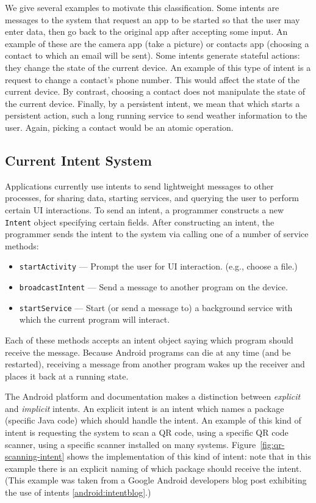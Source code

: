 \documentclass{acm_proc_article-sp}
\begin{document}
We give several examples to motivate this classification.  Some
intents are messages to the system that request an app to be started
so that the user may enter data, then go back to the original app
after accepting some input.  An example of these are the camera app
(take a picture) or contacts app (choosing a contact to which an email
will be sent).  Some intents generate stateful actions: they change
the state of the current device.  An example of this type of intent is
a request to change a contact's phone number.  This would affect the
state of the current device.  By contrast, choosing a contact does not
manipulate the state of the current device.  Finally, by a persistent
intent, we mean that which starts a persistent action, such a long
running service to send weather information to the user.  Again,
picking a contact would be an atomic operation.

\subsection{Current Intent System}

Applications currently use intents to send lightweight messages to
other processes, for sharing data, starting services, and querying the
user to perform certain UI interactions.  To send an intent, a
programmer constructs a new \texttt{Intent} object specifying certain
fields.  After constructing an intent, the programmer sends the intent
to the system via calling one of a number of service methods: 
\begin{itemize}
\item \texttt{startActivity} --- Prompt the user for UI
  interaction. (e.g., choose a file.)
\item \texttt{broadcastIntent} --- Send a message to another program
  on the device.
\item \texttt{startService} --- Start (or send a message to) a
  background service with which the current program will interact.
\end{itemize}
Each of these methods accepts an intent object saying which program
should receive the message.  Because Android programs can die at any
time (and be restarted), receiving a message from another program
wakes up the receiver and places it back at a running state.

The Android platform and documentation makes a distinction between
\emph{explicit} and \emph{implicit} intents.  An explicit intent is an
intent which names a package (specific Java code) which should handle
the intent.  An example of this kind of intent is requesting the
system to scan a QR code, using a specific QR code scanner, using a
specific scanner installed on many systems.
Figure~\ref{fig:qr-scanning-intent} shows the implementation of this
kind of intent: note that in this example there is an explicit naming
of which package should receive the intent.  (This example was taken
from a Google Android developers blog post exhibiting the use of
intents \ref{android:intentblog}.)
\end{document}
